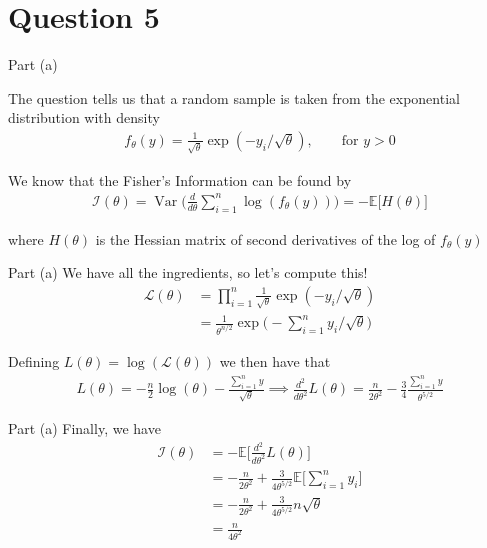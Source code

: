 \section{Question 5}

\begin{frame}{Part (a)}

   The question tells us that a random sample is taken from the exponential distribution with density
   \begin{align*}
       f_\theta(y) = \frac{1}{\sqrt{\theta}} \exp(-y_i / \sqrt{\theta}), \qquad \text{for } y > 0
   \end{align*}

   We know that the Fisher's Information can be found by
   \begin{align*}
       \mathcal{I}(\theta) = \operatorname{Var} \Biggr( \frac{d}{d\theta} \sum_{i=1}^n \log (f_\theta(y)) \Biggr) = - \mathbb{E} \Biggr[ H(\theta) \Biggr]
   \end{align*}

   where $H(\theta)$ is the Hessian matrix of second derivatives of the log of $f_\theta(y)$
   
\end{frame}

\begin{frame}{Part (a)}
    We have all the ingredients, so let's compute this!
    \begin{align*}
        \mathcal{L}(\theta) &= \prod_{i=1}^n \frac{1}{\sqrt{\theta}} \exp(-y_i / \sqrt{\theta})
        \\
        &= \frac{1}{\theta^{n/2}} \exp \Biggr( -\sum_{i=1}^n y_i / \sqrt{\theta} \Biggr)
    \end{align*}

    Defining $L(\theta) = \log (\mathcal{L}(\theta))$ we then have that
    \begin{align*}
        L(\theta) = - \frac{n}{2}\log(\theta) - \frac{\sum_{i=1}^n y}{\sqrt{\theta}} \implies \frac{d^2}{d \theta^2} L(\theta) = \frac{n}{2 \theta^2} - \frac{3}{4} \frac{\sum_{i=1}^n y}{\theta^{5/2}}
    \end{align*}
    
\end{frame}

\begin{frame}{Part (a)}
    Finally, we have
    \begin{align*}
        \mathcal{I}(\theta) &= - \mathbb{E} \Biggr[ \frac{d^2}{d \theta^2} L(\theta) \Biggr]
        \\
        &= - \frac{n}{2\theta^2} + \frac{3}{4\theta^{5/2}} \mathbb{E} \Biggr[ \sum_{i=1}^n y_i \Biggr]
        \\
        &= - \frac{n}{2\theta^2} + \frac{3}{4\theta^{5/2}} n \sqrt{\theta}
        \\
        &= \frac{n}{4 \theta^2}
    \end{align*}
    
\end{frame}

